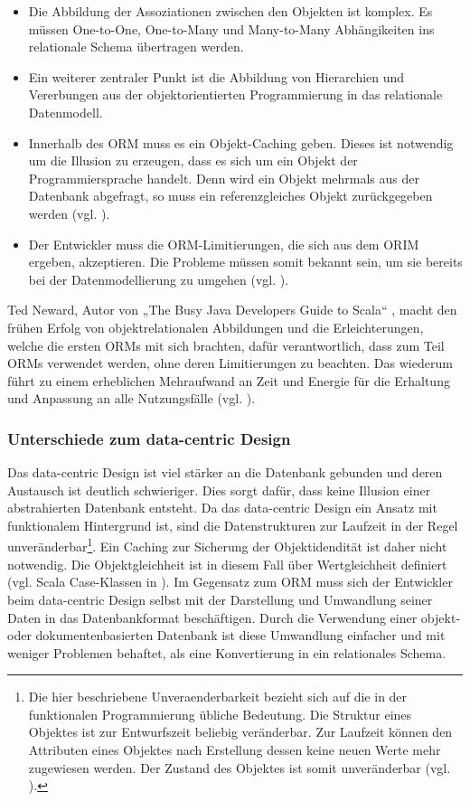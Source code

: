\begin{itemize}
  \item Die Abbildung der Assoziationen zwischen den Objekten ist komplex. Es müssen One-to-One, One-to-Many und Many-to-Many Abhängikeiten ins relationale Schema übertragen werden.
\item Ein weiterer zentraler Punkt ist die Abbildung von Hierarchien und Vererbungen aus der objektorientierten Programmierung in das relationale Datenmodell. 
\item Innerhalb des ORM muss es ein Objekt-Caching geben. Dieses ist notwendig um die Illusion zu erzeugen, dass es sich um ein Objekt der Programmiersprache handelt. Denn wird ein Objekt mehrmals aus der Datenbank abgefragt, so muss ein referenzgleiches Objekt zurückgegeben werden (vgl. \cite{inappropriate-abstractions}).
\item Der Entwickler muss die ORM-Limitierungen, die sich aus dem ORIM ergeben, akzeptieren. Die Probleme müssen somit bekannt sein, um sie bereits bei der Datenmodellierung zu umgehen (vgl. \cite{vietnam}). 
\end{itemize}

Ted Neward, Autor von „The Busy Java Developers Guide to Scala“ \cite{busy-to-scala}, macht den frühen Erfolg von objektrelationalen Abbildungen und die Erleichterungen, welche die ersten ORMs mit sich brachten, dafür verantwortlich, dass zum Teil ORMs verwendet werden, ohne deren Limitierungen zu beachten. Das wiederum führt zu einem erheblichen Mehraufwand an Zeit und Energie für die Erhaltung und Anpassung an alle Nutzungsfälle (vgl. \cite{vietnam}).

\subsubsection{Unterschiede zum data-centric Design}
Das data-centric Design ist viel stärker an die Datenbank gebunden und deren Austausch ist deutlich schwieriger. Dies sorgt dafür, dass keine Illusion einer abstrahierten Datenbank entsteht. Da das data-centric Design ein Ansatz mit funktionalem Hintergrund ist, sind die Datenstrukturen zur Laufzeit in der Regel unveränderbar\footnote{Die hier beschriebene \gls{Unveraenderbarkeit} bezieht sich auf die in der funktionalen Programmierung übliche Bedeutung. Die Struktur eines Objektes ist zur Entwurfszeit beliebig veränderbar. Zur Laufzeit können den Attributen eines Objektes nach Erstellung dessen keine neuen Werte mehr zugewiesen werden. Der Zustand des Objektes ist somit unveränderbar (vgl. \cite[p.~181]{programmieren-in-scala}).}. Ein Caching zur Sicherung der Objektidendität ist daher nicht notwendig. Die Objektgleichheit ist in diesem Fall über Wertgleichheit definiert (vgl. Scala Case-Klassen in \cite{scala-case-class}). Im Gegensatz zum ORM muss sich der Entwickler beim data-centric Design selbst mit der Darstellung und Umwandlung seiner Daten in das Datenbankformat beschäftigen. Durch die Verwendung einer objekt- oder dokumentenbasierten Datenbank ist diese Umwandlung einfacher und mit weniger Problemen behaftet, als eine Konvertierung in ein relationales Schema.

